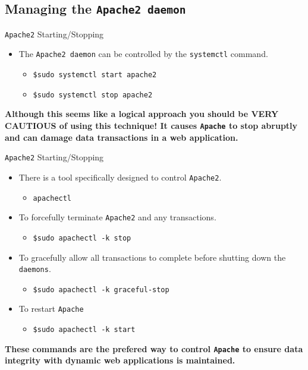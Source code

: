 \documentclass[xcolor=table,aspectratio=169]{beamer}
\begin{document}
\subsection{Managing the \texttt{Apache2 daemon}}
\begin{frame}{\texttt{Apache2} Starting/Stopping}
  \begin{itemize}
    \item The \texttt{Apache2 daemon} can be controlled by the \texttt{systemctl} command.
      \begin{itemize}
        \item \texttt{\$sudo systemctl start apache2}
        \item \texttt{\$sudo systemctl stop apache2}
      \end{itemize}
  \end{itemize}
  \begin{tcolorbox}
    \begin{center}
      \scriptsize \textbf{Although this seems like a logical approach you should be VERY CAUTIOUS of using this technique! It causes \texttt{Apache} to stop abruptly and can damage data transactions in a web application.}
    \end{center}
  \end{tcolorbox}
\end{frame}

\begin{frame}{\texttt{Apache2} Starting/Stopping}
  \begin{itemize}
    \item There is a tool specifically designed to control \texttt{Apache2}.
      \begin{itemize}
        \item \texttt{apachectl}
      \end{itemize}
    \item To forcefully terminate \texttt{Apache2} and any transactions.
      \begin{itemize}
        \item \texttt{\$sudo apachectl -k stop}
      \end{itemize}
    \item To gracefully allow all transactions to complete before shutting down the \texttt{daemons}. 
      \begin{itemize}
        \item \texttt{\$sudo apachectl -k graceful-stop}
      \end{itemize}
    \item To restart \texttt{Apache}
      \begin{itemize}
        \item \texttt{\$sudo apachectl -k start}
      \end{itemize}
  \end{itemize}
  \begin{tcolorbox}
    \begin{center}
      \scriptsize \textbf{These commands are the prefered way to control \texttt{Apache} to ensure data integrity with dynamic web applications is maintained.}
    \end{center}
  \end{tcolorbox}
\end{frame}
\end{document}
